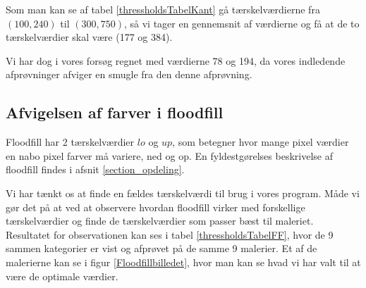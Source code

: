 Som man kan se af tabel \ref{thressholdsTabelKant} gå tærskelværdierne
fra $(100,240)$ til $(300,750)$, så vi tager en gennemsnit af værdierne
og få at de to tærskelværdier skal være (177 og 384). 

Vi har dog i vores forsøg regnet med værdierne 78 og 194, da vores
indledende afprøvninger afviger en smugle fra den denne afprøvning.

\subsection{Afvigelsen af farver i floodfill}
Floodfill har 2 tærskelværdier $lo$ og $up$, som betegner hvor mange
pixel værdier en nabo pixel farver må variere, ned og op. En
fyldestgørelses beskrivelse af floodfill findes i afsnit
\ref{section_opdeling}. 

Vi har tænkt os at finde en fældes tærskelværdi til brug i vores
program. Måde vi gør det på at ved at observere hvordan floodfill virker
med forskellige tærskelværdier og finde de tærskelværdier som passer
bæst til maleriet. Resultatet for observationen kan ses i tabel
\ref{thressholdsTabelFF}, hvor de 9 sammen kategorier er vist og
afprøvet på de samme 9 malerier. Et af de malerierne kan se i
figur \ref{Floodfillbilledet}, hvor man kan se hvad vi har valt til at
være de optimale værdier.

